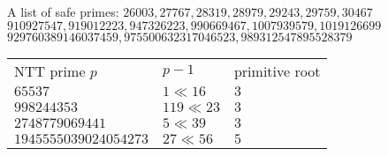 A list of safe primes:
$26003, 27767, 28319, 28979, 29243, 29759, 30467$ \\
$910927547, 919012223, 947326223, 990669467, 1007939579, 1019126699$ \\
$929760389146037459, 975500632317046523, 989312547895528379$ \\
\begin{tabular}{|l|l|l|}

    NTT prime $p$         & $p - 1$      & primitive root   \\
    $65537$               & $1 \ll 16$   & $3$              \\
    $998244353$           & $119 \ll 23$ & $3$              \\
    $2748779069441$       & $5 \ll 39$   & $3$              \\
    $1945555039024054273$ & $27 \ll 56$  & $5$              \\
\end{tabular}
